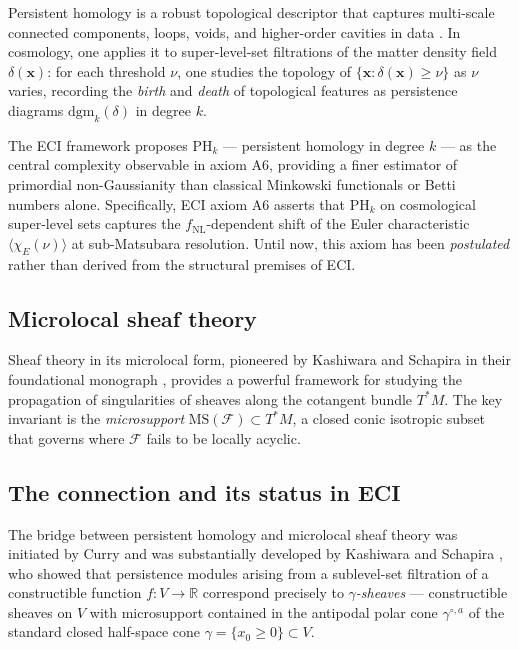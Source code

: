 \documentclass[12pt,a4paper]{amsart}
\theoremstyle{definition}
\newcommand{\R}{\mathbb{R}}
\newcommand{\PHk}{\mathrm{PH}_k}            %
\newcommand{\MS}{\mathrm{MS}}               %
\newcommand{\TsM}{T^*M}                     %
\newcommand{\gammaop}{\gamma^{\circ,a}}     %
\begin{document}
Persistent homology is a robust topological descriptor that captures
multi-scale connected components, loops, voids, and higher-order
cavities in data \cite{EdelsbrunnerHarer2010}. In cosmology, one applies
it to super-level-set filtrations of the matter density field
$\delta(\mathbf{x})$: for each threshold $\nu$, one studies the
topology of $\{\mathbf{x} : \delta(\mathbf{x}) \geq \nu\}$ as $\nu$
varies, recording the \emph{birth} and \emph{death} of topological
features as persistence diagrams $\mathrm{dgm}_k(\delta)$ in degree
$k$.

The ECI framework \cite{ECI2026} proposes $\PHk$ --- persistent
homology in degree $k$ --- as the central complexity observable in axiom
A6, providing a finer estimator of primordial non-Gaussianity than
classical Minkowski functionals or Betti numbers alone.  Specifically,
ECI axiom A6 asserts that $\PHk$ on cosmological super-level sets
captures the $f_\mathrm{NL}$-dependent shift of the Euler characteristic
$\langle\chi_E(\nu)\rangle$ at sub-Matsubara resolution.
Until now, this axiom has been \emph{postulated} rather than derived
from the structural premises of ECI.

\subsection*{Microlocal sheaf theory}

Sheaf theory in its microlocal form, pioneered by Kashiwara and Schapira
in their foundational monograph \cite{KS1990}, provides a powerful
framework for studying the propagation of singularities of sheaves along
the cotangent bundle $\TsM$.  The key invariant is the
\emph{microsupport} $\MS(\mathcal{F}) \subset \TsM$, a closed conic
isotropic subset that governs where $\mathcal{F}$ fails to be locally
acyclic.

\subsection*{The connection and its status in ECI}

The bridge between persistent homology and microlocal sheaf theory was
initiated by Curry \cite{Curry2014} and was substantially developed by
Kashiwara and Schapira \cite{KS2018}, who showed that persistence
modules arising from a sublevel-set filtration of a constructible
function $f: V \to \R$ correspond precisely to \emph{$\gamma$-sheaves}
--- constructible sheaves on $V$ with microsupport contained in the
antipodal polar cone $\gammaop$ of the standard closed half-space cone
$\gamma = \{x_0 \geq 0\} \subset V$.
\end{document}

